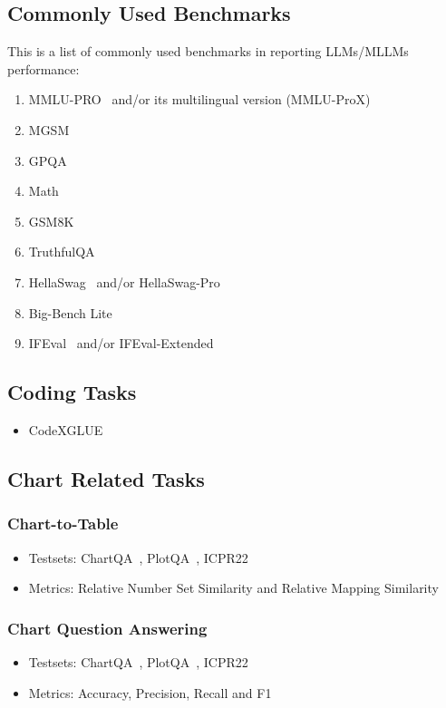 \documentclass[
	letterpaper, %
]{jdf}
\begin{document}
\subsection{Commonly Used Benchmarks}\label{ssect:common}
This is a list of commonly used benchmarks in reporting LLMs/MLLMs performance:
\begin{enumerate}
    \item MMLU-PRO~\cite{wang2024mmlu} and/or its multilingual version (MMLU-ProX)~\cite{xuan2025mmlu}
    \item MGSM~\cite{shi2022language}
    \item GPQA~\cite{rein2024gpqa}
    \item Math~\cite{hendrycks2021measuring}
    \item GSM8K~\cite{cobbe2021training}
    \item TruthfulQA\cite{lin2021truthfulqa}
    \item HellaSwag~\cite{zellers2019hellaswag} and/or HellaSwag-Pro~\cite{li2025hellaswag}
    \item Big-Bench Lite~\cite{srivastava2023beyond}
    \item IFEval~\cite{zhou2023instruction} and/or IFEval-Extended~\cite{kovalevskyi2024ifeval}
              \end{enumerate}
              \subsection{Coding Tasks}
              \begin{itemize}
    \item CodeXGLUE~\cite{lu2021codexglue}
                            \end{itemize}
                            \subsection{Chart Related Tasks}
\subsubsection{Chart-to-Table}
\begin{itemize}
    \item Testsets: ChartQA~\cite{masry2022chartqa}, PlotQA~\cite{methani2020plotqa}, ICPR22
         \item Metrics: Relative Number Set Similarity and Relative Mapping Similarity~\cite{liu2022deplot}
              \end{itemize}
\subsubsection{Chart Question Answering}
\begin{itemize}
    \item Testsets: ChartQA~\cite{masry2022chartqa}, PlotQA~\cite{methani2020plotqa}, ICPR22
         \item Metrics: Accuracy, Precision, Recall and F1
              \end{itemize}
\end{document}
